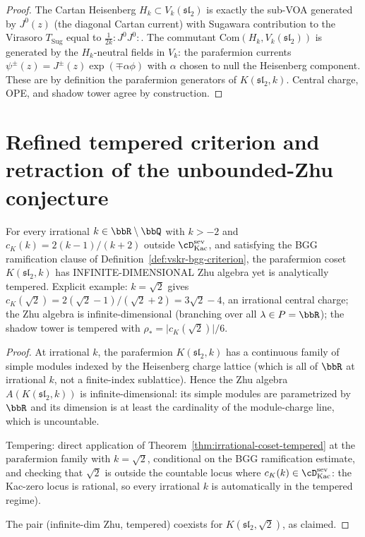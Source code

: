 \begin{proof}
The Cartan Heisenberg $H_k \subset V_k(\mathfrak{sl}_2)$ is exactly
the sub-VOA generated by $J^0(z)$ (the diagonal Cartan current) with
Sugawara contribution to the Virasoro $T_{\mathrm{Sug}}$ equal to
$\tfrac{1}{2 k} :\! J^0 J^0 \!:$. The commutant
$\mathrm{Com}(H_k, V_k(\mathfrak{sl}_2))$ is generated by the
$H_k$-neutral fields in $V_k$: the parafermion currents
$\psi^\pm(z) = J^\pm(z) \exp(\mp \alpha \phi)$ with $\alpha$ chosen
to null the Heisenberg component. These are by definition the
parafermion generators of $K(\mathfrak{sl}_2, k)$. Central charge,
OPE, and shadow tower agree by construction.
\end{proof}

\section{Refined tempered criterion and retraction of the
unbounded-Zhu conjecture}
\label{sec:refined-criterion}

\begin{proposition}
\label{prop:zhu-unbounded-tempered-nontrivial}
\ClaimStatusConditional
For every irrational $k \in \bbR \setminus \bbQ$ with $k > -2$ and
$c_K(k) = 2(k-1)/(k+2)$ outside
$\cD^{\mathrm{sev}}_{\mathrm{Kac}}$, and satisfying the BGG
ramification clause of Definition~\ref{def:vskr-bgg-criterion}, the
parafermion coset
$K(\mathfrak{sl}_2, k)$ has INFINITE-DIMENSIONAL Zhu algebra yet is
analytically tempered. Explicit example:
$k = \sqrt{2}$ gives $c_K(\sqrt{2}) = 2(\sqrt{2} - 1)/(\sqrt{2} + 2)
= 3 \sqrt{2} - 4$, an irrational central charge;
the Zhu algebra is infinite-dimensional (branching over all
$\lambda \in P = \bbR$); the shadow tower is tempered with
$\rho_* = \lvert c_K(\sqrt{2}) \rvert / 6$.
\end{proposition}

\begin{proof}
At irrational $k$, the parafermion $K(\mathfrak{sl}_2, k)$ has a
continuous family of simple modules indexed by the Heisenberg
charge lattice (which is all of $\bbR$ at irrational $k$, not a
finite-index sublattice). Hence the Zhu algebra $A(K(\mathfrak{sl}_2,
k))$ is infinite-dimensional: its simple modules are parametrized
by $\bbR$ and its dimension is at least the cardinality of the
module-charge line, which is uncountable.

Tempering: direct application of
Theorem~\ref{thm:irrational-coset-tempered} at the
$\mathrm{parafermion}$ family with $k = \sqrt{2}$, conditional on the
BGG ramification estimate, and checking that
$\sqrt{2}$ is outside the countable locus where $c_K(k) \in
\cD^{\mathrm{sev}}_{\mathrm{Kac}}$: the Kac-zero locus is rational,
so every irrational $k$ is automatically in the tempered regime).

The pair (infinite-dim Zhu, tempered) coexists for $K(\mathfrak{sl}_2,
\sqrt{2})$, as claimed.
\end{proof}

